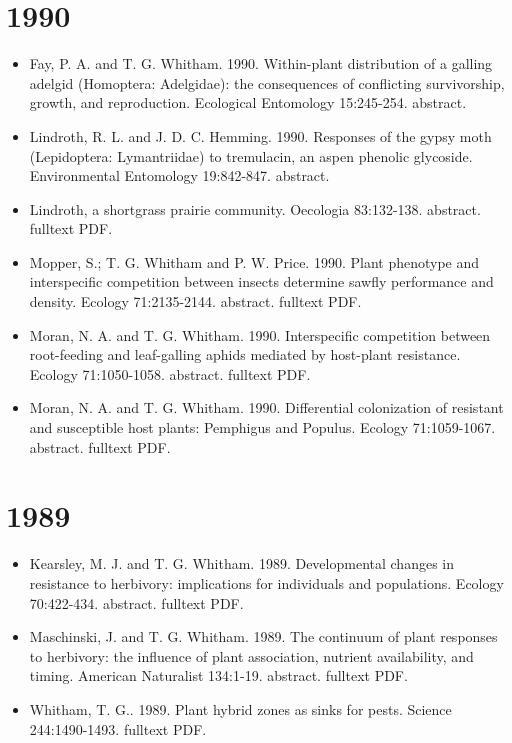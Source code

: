 \documentclass[12pt]{article}
\begin{document}
\section{1990}
\begin{itemize}
\item Fay, P. A. and T. G. Whitham. 1990. Within-plant distribution of a
galling adelgid (Homoptera: Adelgidae): the consequences of
conflicting survivorship, growth, and reproduction. Ecological
Entomology 15:245-254. abstract.
 
\item Lindroth, R. L. and J. D. C. Hemming. 1990. Responses of the gypsy
moth (Lepidoptera: Lymantriidae) to tremulacin, an aspen phenolic
glycoside. Environmental Entomology 19:842-847. abstract.
 
\item Lindroth, a shortgrass prairie community. Oecologia
83:132-138. abstract. fulltext PDF.
 
\item Mopper, S.; T. G. Whitham and P. W. Price. 1990. Plant phenotype and
interspecific competition between insects determine sawfly performance
and density. Ecology 71:2135-2144. abstract. fulltext PDF.
 
\item Moran, N. A. and T. G. Whitham. 1990. Interspecific competition
between root-feeding and leaf-galling aphids mediated by host-plant
resistance. Ecology 71:1050-1058. abstract. fulltext PDF.
 
\item Moran, N. A. and T. G. Whitham. 1990. Differential colonization of
resistant and susceptible host plants: Pemphigus and Populus. Ecology
71:1059-1067. abstract. fulltext PDF.
 
\end{itemize}

\section{1989}
\begin{itemize}
\item Kearsley, M. J. and T. G. Whitham. 1989. Developmental changes in
resistance to herbivory: implications for individuals and
populations. Ecology 70:422-434. abstract. fulltext PDF.

\item Maschinski, J. and T. G. Whitham. 1989. The continuum of plant
responses to herbivory: the influence of plant association, nutrient
availability, and timing. American Naturalist
134:1-19. abstract. fulltext PDF.
 
\item Whitham, T. G.. 1989. Plant hybrid zones as sinks for pests. Science
244:1490-1493. fulltext PDF.
 
\end{itemize}
\end{document}
